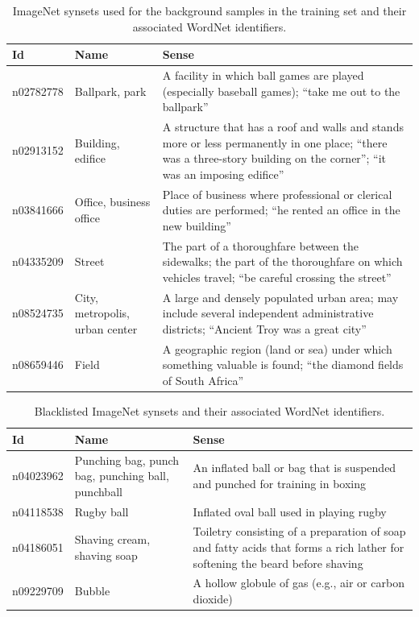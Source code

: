 \documentclass{sig-alternate-05-2015}
\begin{document}
{{      \begin{table}
        \centering
        \caption{ImageNet synsets used for the background samples in the training set and their associated WordNet identifiers.}
				\label{tab:background_samples}
        \begin{tabularx}{\textwidth}{@{}lp{4cm}X@{}}
          \toprule
          \textbf{Id} & \textbf{Name} & \textbf{Sense} \\
          \midrule
            n02782778 & Ballpark, park & A facility in which ball games are played (especially baseball games); ``take me out to the ballpark'' \\
            n02913152 & Building, edifice & A structure that has a roof and walls and stands more or less permanently in one place; ``there was a three-story building on the corner''; ``it was an imposing edifice'' \\
            n03841666 & Office, business office & Place of business where professional or clerical duties are performed; ``he rented an office in the new building'' \\
            n04335209 & Street & The part of a thoroughfare between the sidewalks; the part of the thoroughfare on which vehicles travel; ``be careful crossing the street'' \\
            n08524735 & City, metropolis, urban center & A large and densely populated urban area; may include several independent administrative districts; ``Ancient Troy was a great city'' \\
            n08659446 & Field & A geographic region (land or sea) under which something valuable is found; ``the diamond fields of South Africa'' \\
          \bottomrule
        \end{tabularx}
      \end{table}

      \begin{table}
        \centering
        \caption{Blacklisted ImageNet synsets and their associated WordNet identifiers.}
        \label{tab:blacklisted_synsets}
        \begin{tabularx}{\textwidth}{@{}lp{4cm}X@{}}
          \toprule
          \textbf{Id} & \textbf{Name} & \textbf{Sense} \\
          \midrule
              n04023962 & Punching bag, punch bag, punching ball, punchball & An inflated ball or bag that is suspended and punched for training in boxing \\
              n04118538 & Rugby ball & Inflated oval ball used in playing rugby \\
              n04186051 & Shaving cream, shaving soap & Toiletry consisting of a preparation of soap and fatty acids that forms a rich lather for softening the beard before shaving \\
              n09229709 & Bubble & A hollow globule of gas (e.g., air or carbon dioxide) \\
          \bottomrule
        \end{tabularx}
      \end{table}
		}
	}
\end{document}
